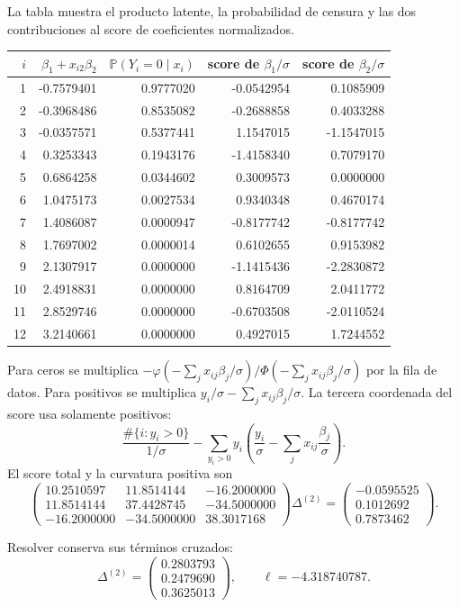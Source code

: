 \documentclass[11pt,a4paper]{article}
\newcommand{\Prob}{\mathbb P}
\begin{document}
La tabla muestra el producto latente,
la probabilidad de censura y
las dos contribuciones al score
de coeficientes normalizados.
\begin{center}\small\begin{tabular}{rrrrr}\toprule
\(i\)&\(\beta_1+x_{i2}\beta_2\)&\(\Prob(Y_i=0\mid x_i)\)&score de \(\beta_1/\sigma\)&score de \(\beta_2/\sigma\)\\\midrule
1&-0.7579401&0.9777020&-0.0542954&0.1085909\\
2&-0.3968486&0.8535082&-0.2688858&0.4033288\\
3&-0.0357571&0.5377441&1.1547015&-1.1547015\\
4&0.3253343&0.1943176&-1.4158340&0.7079170\\
5&0.6864258&0.0344602&0.3009573&0.0000000\\
6&1.0475173&0.0027534&0.9340348&0.4670174\\
7&1.4086087&0.0000947&-0.8177742&-0.8177742\\
8&1.7697002&0.0000014&0.6102655&0.9153982\\
9&2.1307917&0.0000000&-1.1415436&-2.2830872\\
10&2.4918831&0.0000000&0.8164709&2.0411772\\
11&2.8529746&0.0000000&-0.6703508&-2.0110524\\
12&3.2140661&0.0000000&0.4927015&1.7244552\\\bottomrule\end{tabular}\end{center}
Para ceros se multiplica
\(-\varphi(-\sum_jx_{ij}\beta_j/\sigma)/
\Phi(-\sum_jx_{ij}\beta_j/\sigma)\)
por la fila de datos.
Para positivos se multiplica
\(y_i/\sigma-\sum_jx_{ij}\beta_j/\sigma\).
La tercera coordenada del score
usa solamente positivos:
\[
\frac{\#\{i:y_i>0\}}{1/\sigma}
-\sum_{y_i>0}y_i\left(\frac{y_i}{\sigma}
-\sum_jx_{ij}\frac{\beta_j}{\sigma}\right).
\]
El score total y la curvatura positiva son
\[
\begin{pmatrix}10.2510597&11.8514144&-16.2000000\\11.8514144&37.4428745&-34.5000000\\-16.2000000&-34.5000000&38.3017168\end{pmatrix}\Delta^{(2)}=\begin{pmatrix}-0.0595525\\0.1012692\\0.7873462\end{pmatrix}.
\]

Resolver conserva sus términos cruzados:
\[
\Delta^{(2)}=\begin{pmatrix}0.2803793\\0.2479690\\0.3625013\end{pmatrix},\qquad\ell=-4.318740787.
\]
\end{document}
